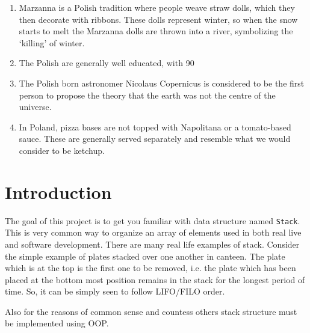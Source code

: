 \documentclass{42-en}
\begin{document}
\begin{enumerate}
                \item Marzanna is a Polish tradition where people weave straw dolls, which they then decorate with ribbons. These dolls represent winter, so when the snow starts to melt the Marzanna dolls are thrown into a river, symbolizing the ‘killing’ of winter.
                \item The Polish are generally well educated, with 90%
                \item The Polish born astronomer Nicolaus Copernicus is considered to be the first person to propose the theory that the earth was not the centre of the universe.
                \item In Poland, pizza bases are not topped with Napolitana or a tomato-based sauce. These are generally served separately and resemble what we would consider to be ketchup.\\
            \end{enumerate}


\chapter{Introduction}

    The goal of this project is to get you familiar with data structure named 
    \texttt{Stack}. This is very common way to organize an array of elements
    used in both real live and software development. There are many real life
    examples of stack. Consider the simple example of plates stacked over one 
    another in canteen. The plate which is at the top is the first one to be 
    removed, i.e. the plate which has been placed at the bottom most position 
    remains in the stack for the longest period of time. 
    So, it can be simply seen to follow LIFO/FILO order.
    
    Also for the reasons of common sense and countess others stack structure
    must be implemented using OOP.
    
\end{document}

